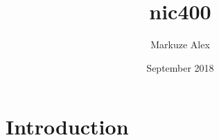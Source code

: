 \documentclass[sigplan,10pt]{acmart}
\title{nic400}
\author{Markuze Alex}
\date{September 2018}
\begin{document}
\maketitle
\section{Introduction}
\end{document}
